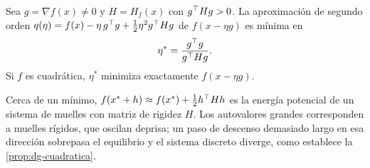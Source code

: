 \begin{proposicion}\label{prop:paso-optimo}
Sea $g=\nabla f(x)\ne 0$ y $H=H_f(x)$ con $g^{\top} Hg>0$. La aproximación de segundo orden $q(\eta)=f(x)-\eta\,g^{\top} g+\tfrac12\eta^{2}g^{\top} Hg$ de $f(x-\eta g)$ es mínima en
\[
\eta^{*}=\frac{g^{\top} g}{g^{\top} Hg}.
\]
Si $f$ es cuadrática, $\eta^{*}$ minimiza exactamente $f(x-\eta g)$.
\end{proposicion}

\addtocounter{definicion}{1}%

\begin{observacion}
Cerca de un mínimo, $f(x^{*}+h)\approx f(x^{*})+\tfrac12h^{\top} Hh$ es la energía potencial de un sistema de muelles con matriz de rigidez $H$. Los autovalores grandes corresponden a muelles rígidos, que oscilan deprisa; un paso de descenso demasiado largo en esa dirección sobrepasa el equilibrio y el sistema discreto diverge, como establece la \cref{prop:dg-cuadratica}.
\end{observacion}

